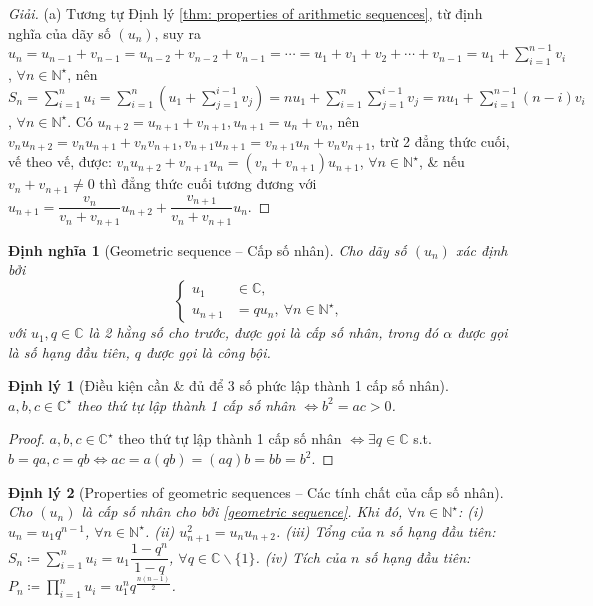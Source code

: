 \documentclass{article}
\newtheorem{dinhly}{Định lý}
\newtheorem{dinhnghia}{Định nghĩa}
\begin{document}
\begin{proof}[Giải]
	(a) Tương tự Định lý \ref{thm: properties of arithmetic sequences}, từ định nghĩa của dãy số $(u_n)$, suy ra $u_n = u_{n-1} + v_{n-1} = u_{n-2} + v_{n-2} + v_{n-1} = \cdots = u_1 + v_1 + v_2 + \cdots + v_{n-1} = u_1 + \sum_{i=1}^{n-1} v_i$, $\forall n\in\mathbb{N}^\star$, nên $S_n = \sum_{i=1}^n u_i = \sum_{i=1}^n \left(u_1 + \sum_{j=1}^{i-1} v_j\right) = nu_1 + \sum_{i=1}^n\sum_{j=1}^{i-1} v_j = nu_1 + \sum_{i=1}^{n-1} (n - i)v_i$, $\forall n\in\mathbb{N}^\star$. Có $u_{n+2} = u_{n+1} + v_{n+1},u_{n+1} = u_n + v_n$, nên $v_nu_{n+2} = v_nu_{n+1} + v_nv_{n+1},v_{n+1}u_{n+1} = v_{n+1}u_n + v_nv_{n+1}$, trừ 2 đẳng thức cuối, vế theo vế, được: $v_nu_{n+2} + v_{n+1}u_n = (v_n + v_{n+1})u_{n+1}$, $\forall n\in\mathbb{N}^\star$, \& nếu $v_n + v_{n+1}\ne0$ thì đẳng thức cuối tương đương với $u_{n+1} = \dfrac{v_n}{v_n + v_{n+1}}u_{n+2} + \dfrac{v_{n+1}}{v_n + v_{n+1}}u_n$.
\end{proof}

\begin{dinhnghia}[Geometric sequence -- Cấp số nhân]
	Cho dãy số $(u_n)$ xác định bởi
	\begin{equation}
		\label{geometric sequence}
		\tag{csn}
		\left\{\begin{split}
			u_1&\in\mathbb{C},\\
			u_{n+1} &= qu_n,\ \forall n\in\mathbb{N}^\star,
		\end{split}\right.
	\end{equation}
	với $u_1,q\in\mathbb{C}$ là 2 hằng số cho trước, được gọi là {\rm cấp số nhân}, trong đó $\alpha$ được gọi là {\rm số hạng đầu tiên}, $q$ được gọi là {\rm công bội}.
\end{dinhnghia}

\begin{dinhly}[Điều kiện cần \& đủ để 3 số phức lập thành 1 cấp số nhân]
	$a,b,c\in\mathbb{C}^\star$ theo thứ tự lập thành 1 cấp số nhân $\Leftrightarrow b^2 = ac > 0$.
\end{dinhly}

\begin{proof}
	$a,b,c\in\mathbb{C}^\star$ theo thứ tự lập thành 1 cấp số nhân $\Leftrightarrow\exists q\in\mathbb{C}$ s.t. $b = qa,c = qb\Leftrightarrow ac = a(qb) = (aq)b = bb = b^2$.
\end{proof}

\begin{dinhly}[Properties of geometric sequences -- Các tính chất của cấp số nhân]
	\label{thm: properties of geometric sequences}
	Cho $(u_n)$ là cấp số nhân cho bởi \eqref{geometric sequence}. Khi đó, $\forall n\in\mathbb{N}^\star$: (i) $u_n = u_1q^{n-1}$, $\forall n\in\mathbb{N}^\star$. (ii) $u_{n+1}^2 = u_nu_{n+2}$. (iii) Tổng của $n$ số hạng đầu tiên: $S_n\coloneqq\sum_{i=1}^n u_i = u_1\dfrac{1 - q^n}{1 - q}$, $\forall q\in\mathbb{C}\backslash\{1\}$. (iv) Tích của $n$ số hạng đầu tiên: $P_n\coloneqq\prod_{i=1}^n u_i = u_1^nq^{\frac{n(n - 1)}{2}}$.
\end{dinhly}
\end{document}
